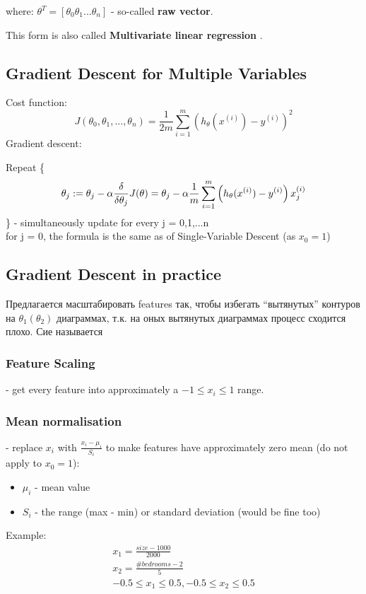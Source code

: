 \documentclass{scrartcl}
\begin{document}
where: $\theta^T = [\theta_0 \theta_1 ... \theta_n]$ - so-called {\bf
  raw vector}.

This form is also called {\bf Multivariate linear regression }.

\subsection {Gradient Descent for Multiple Variables}
Cost function:
\[
J(\theta_0, \theta_1, ..., \theta_n) = \frac{1}{2m}
\sum\limits_{i=1}^m\left(h_\theta(x^{(i)}) - y^{(i)} \right)^2
\]
Gradient descent:

Repeat \{
\[ \theta_j := \theta_j - \alpha \frac
{\delta}{\delta\theta_j}J(\theta) \\
= \theta_j - \alpha \frac{1}{m}
\sum\limits_{i=1}^m\left(h_\theta(x^{(i)}) - y^{(i)}
\right)x_j^{(i)} \]
\} - simultaneously update for every j = 0,1,...n \\
for j = 0, the formula is the same as of Single-Variable Descent (as
$x_0 = 1$)
\label {4-3}
\subsection {Gradient Descent in practice}
Предлагается масштабировать features так, чтобы избегать ``вытянутых''
контуров на $\theta_1(\theta_2)$ диаграммах, т.к. на оных вытянутых
диаграммах процесс сходится плохо. Сие называется

\subsubsection{ Feature Scaling} 
- get every feature into approximately a $-1 \leq x_i \leq 1$ range.
\subsubsection {Mean normalisation}
- replace $x_i$ with $\frac{x_i - \mu_i}{S_i}$ to make features have
approximately zero mean (do not apply to $x_0 = 1$):
\begin{itemize}
\item{$\mu_i$} - mean value
\item{$S_i$} - the range (max - min) or standard deviation (would be
  fine too)
\end{itemize}
Example:
\begin{equation*}
  \begin{split}
    x_1 = \frac{size-1000}{2000} \\
    x_2 = \frac{\#bedrooms-2}{5} \\
    -0.5 \leq x_1 \leq 0.5, -0.5 \leq x_2 \leq 0.5
  \end{split}
\end{equation*}
\end{document}
